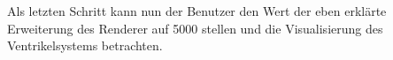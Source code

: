 \newline
Als letzten Schritt kann nun der Benutzer den Wert der eben erklärte Erweiterung des Renderer auf 5000 stellen und die Visualisierung des Ventrikelsystems betrachten.













































